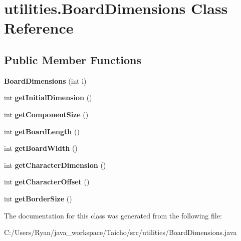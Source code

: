 \hypertarget{classutilities_1_1_board_dimensions}{\section{utilities.\-Board\-Dimensions Class Reference}
\label{classutilities_1_1_board_dimensions}
}
\subsection*{Public Member Functions}
\begin{DoxyCompactItemize}
\item 
\hypertarget{classutilities_1_1_board_dimensions_ae8b8ab243cab26ce5387d86a6b21c5fc}{{\bfseries Board\-Dimensions} (int i)}\label{classutilities_1_1_board_dimensions_ae8b8ab243cab26ce5387d86a6b21c5fc}

\item 
\hypertarget{classutilities_1_1_board_dimensions_a5e79553797ca92a278e9f42e602aa662}{int {\bfseries get\-Initial\-Dimension} ()}\label{classutilities_1_1_board_dimensions_a5e79553797ca92a278e9f42e602aa662}

\item 
\hypertarget{classutilities_1_1_board_dimensions_abe9d16412977f136961fe68a72466fd0}{int {\bfseries get\-Component\-Size} ()}\label{classutilities_1_1_board_dimensions_abe9d16412977f136961fe68a72466fd0}

\item 
\hypertarget{classutilities_1_1_board_dimensions_af934dee30fbcbd0cfba36c38b5e7cd22}{int {\bfseries get\-Board\-Length} ()}\label{classutilities_1_1_board_dimensions_af934dee30fbcbd0cfba36c38b5e7cd22}

\item 
\hypertarget{classutilities_1_1_board_dimensions_af03590368e29d01f3ba7a35866e78047}{int {\bfseries get\-Board\-Width} ()}\label{classutilities_1_1_board_dimensions_af03590368e29d01f3ba7a35866e78047}

\item 
\hypertarget{classutilities_1_1_board_dimensions_a60cabf6136c17565e88695097adf52c6}{int {\bfseries get\-Character\-Dimension} ()}\label{classutilities_1_1_board_dimensions_a60cabf6136c17565e88695097adf52c6}

\item 
\hypertarget{classutilities_1_1_board_dimensions_ae7f0b12ede2cac7e9dd9e06e4166984d}{int {\bfseries get\-Character\-Offset} ()}\label{classutilities_1_1_board_dimensions_ae7f0b12ede2cac7e9dd9e06e4166984d}

\item 
\hypertarget{classutilities_1_1_board_dimensions_ab3374c5be2ba03653937ed841cccf430}{int {\bfseries get\-Border\-Size} ()}\label{classutilities_1_1_board_dimensions_ab3374c5be2ba03653937ed841cccf430}

\end{DoxyCompactItemize}


The documentation for this class was generated from the following file\-:\begin{DoxyCompactItemize}
\item 
C\-:/\-Users/\-Ryan/java\-\_\-workspace/\-Taicho/src/utilities/Board\-Dimensions.\-java\end{DoxyCompactItemize}
